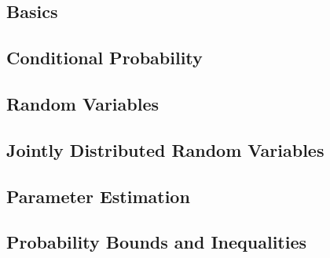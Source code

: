 \documentclass[twoside,twocolumn]{article}
\begin{document}
\subsection{Basics}
\subsection{Conditional Probability}
\subsection{Random Variables}
\subsection{Jointly Distributed Random Variables}
\subsection{Parameter Estimation}
\subsection{Probability Bounds and Inequalities}
\end{document}
